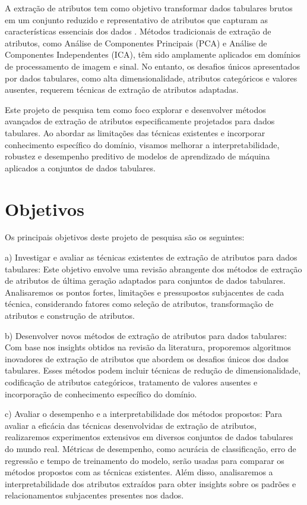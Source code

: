 \documentclass{article}
\begin{document}
A extração de atributos tem como objetivo transformar dados tabulares brutos em um conjunto reduzido e representativo de atributos que capturam as características essenciais dos dados \cite{Guyon2006}. Métodos tradicionais de extração de atributos, como Análise de Componentes Principais (PCA) e Análise de Componentes Independentes (ICA), têm sido amplamente aplicados em domínios de processamento de imagem e sinal. No entanto, os desafios únicos apresentados por dados tabulares, como alta dimensionalidade, atributos categóricos e valores ausentes, requerem técnicas de extração de atributos adaptadas.

Este projeto de pesquisa tem como foco explorar e desenvolver métodos avançados de extração de atributos especificamente projetados para dados tabulares. Ao abordar as limitações das técnicas existentes e incorporar conhecimento específico do domínio, visamos melhorar a interpretabilidade, robustez e desempenho preditivo de modelos de aprendizado de máquina aplicados a conjuntos de dados tabulares.
   
\section{Objetivos}

Os principais objetivos deste projeto de pesquisa são os seguintes:

a) Investigar e avaliar as técnicas existentes de extração de atributos para dados tabulares: Este objetivo envolve uma revisão abrangente dos métodos de extração de atributos de última geração adaptados para conjuntos de dados tabulares. Analisaremos os pontos fortes, limitações e pressupostos subjacentes de cada técnica, considerando fatores como seleção de atributos, transformação de atributos e construção de atributos.

b) Desenvolver novos métodos de extração de atributos para dados tabulares: Com base nos insights obtidos na revisão da literatura, proporemos algoritmos inovadores de extração de atributos que abordem os desafios únicos dos dados tabulares. Esses métodos podem incluir técnicas de redução de dimensionalidade, codificação de atributos categóricos, tratamento de valores ausentes e incorporação de conhecimento específico do domínio.

c) Avaliar o desempenho e a interpretabilidade dos métodos propostos: Para avaliar a eficácia das técnicas desenvolvidas de extração de atributos, realizaremos experimentos extensivos em diversos conjuntos de dados tabulares do mundo real. Métricas de desempenho, como acurácia de classificação, erro de regressão e tempo de treinamento do modelo, serão usadas para comparar os métodos propostos com as técnicas existentes. Além disso, analisaremos a interpretabilidade dos atributos extraídos para obter insights sobre os padrões e relacionamentos subjacentes presentes nos dados.
   
\end{document}
